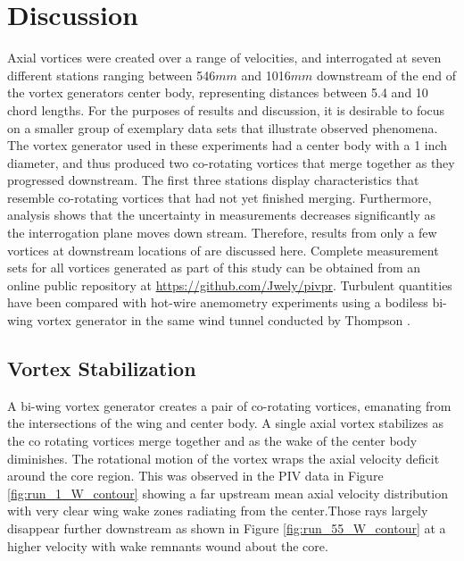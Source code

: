
\section{Discussion}

Axial vortices were created over a range of velocities, and interrogated at 
seven different stations ranging between 546$mm$ and 1016$mm$ downstream of the 
end of the vortex generators center body, representing distances between 5.4 
and 10 chord lengths. For the 
purposes of results and discussion, it is desirable to focus on a smaller group 
of exemplary data sets that illustrate observed phenomena. The vortex generator 
used in these experiments had a center body with a 1 inch diameter, and thus 
produced two co-rotating vortices that merge together as they progressed 
downstream. 
The first three stations display characteristics that resemble co-rotating 
vortices that had not yet finished merging. Furthermore, analysis shows that 
the uncertainty in measurements decreases significantly as the interrogation 
plane moves down stream. Therefore, results from only a few vortices at 
downstream locations of are discussed here. Complete measurement sets for all 
vortices generated as part of this study can be obtained from an online public 
repository at \url{https://github.com/Jwely/pivpr}. Turbulent quantities have 
been compared with hot-wire anemometry experiments using a bodiless bi-wing 
vortex generator in the same wind tunnel conducted by Thompson 
\cite{thompson2016}.


\subsection{Vortex Stabilization}
A bi-wing vortex generator creates a pair of co-rotating vortices, emanating 
from the intersections of the wing and center body. A single 
axial vortex stabilizes as the co rotating vortices merge together and as the 
wake of the center body diminishes. The rotational motion of the vortex 
wraps the axial velocity deficit around the core region. This was observed 
in the PIV data in Figure \ref{fig:run_1_W_contour} showing a far upstream 
mean axial velocity distribution with very clear wing wake zones radiating from 
the center.Those rays largely disappear further downstream as shown in Figure 
\ref{fig:run_55_W_contour} at a higher velocity with wake remnants wound about 
the core. 




